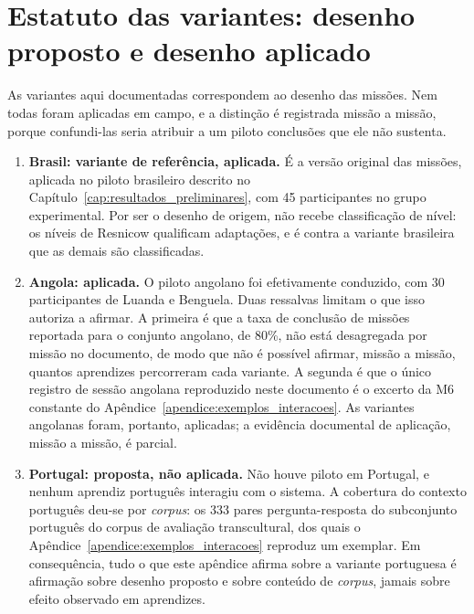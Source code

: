 \section*{Estatuto das variantes: desenho proposto e desenho aplicado}

As variantes aqui documentadas correspondem ao desenho das missões. Nem todas foram aplicadas em campo, e a distinção é registrada missão a missão, porque confundi-las seria atribuir a um piloto conclusões que ele não sustenta.

\begin{enumerate}
\item[(a)] \textbf{Brasil: variante de referência, aplicada.} É a versão original das missões, aplicada no piloto brasileiro descrito no Capítulo~\ref{cap:resultados_preliminares}, com 45 participantes no grupo experimental. Por ser o desenho de origem, não recebe classificação de nível: os níveis de Resnicow qualificam adaptações, e é contra a variante brasileira que as demais são classificadas.

\item[(b)] \textbf{Angola: aplicada.} O piloto angolano foi efetivamente conduzido, com 30 participantes de Luanda e Benguela. Duas ressalvas limitam o que isso autoriza a afirmar. A primeira é que a taxa de conclusão de missões reportada para o conjunto angolano, de 80\%, não está desagregada por missão no documento, de modo que não é possível afirmar, missão a missão, quantos aprendizes percorreram cada variante. A segunda é que o único registro de sessão angolana reproduzido neste documento é o excerto da M6 constante do Apêndice~\ref{apendice:exemplos_interacoes}. As variantes angolanas foram, portanto, aplicadas; a evidência documental de aplicação, missão a missão, é parcial.

\item[(c)] \textbf{Portugal: proposta, não aplicada.} Não houve piloto em Portugal, e nenhum aprendiz português interagiu com o sistema. A cobertura do contexto português deu-se por \textit{corpus}: os 333 pares pergunta-resposta do subconjunto português do corpus de avaliação transcultural, dos quais o Apêndice~\ref{apendice:exemplos_interacoes} reproduz um exemplar. Em consequência, tudo o que este apêndice afirma sobre a variante portuguesa é afirmação sobre desenho proposto e sobre conteúdo de \textit{corpus}, jamais sobre efeito observado em aprendizes.
\end{enumerate}

